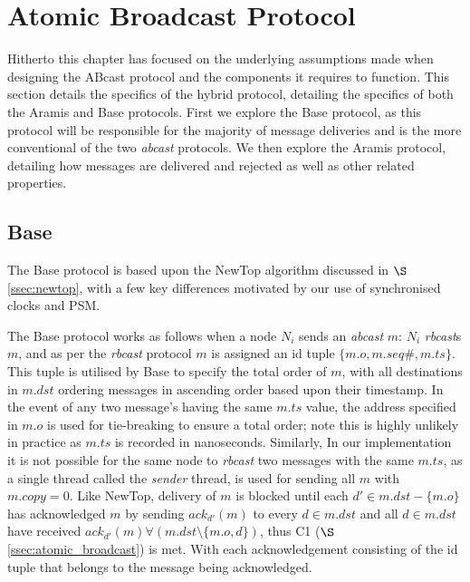 \clearpage
\section{Atomic Broadcast Protocol}\label{sec:ABcast}
Hitherto this chapter has focused on the underlying assumptions made when designing the \textsf{ABcast} protocol and the components it requires to function.  This section details the specifics of the hybrid protocol, detailing the specifics of both the \textsf{Aramis} and \textsf{Base} protocols.  First we explore the \textsf{Base} protocol, as this protocol will be responsible for the majority of message deliveries and is the more conventional of the two \emph{abcast} protocols.  We then explore the \textsf{Aramis} protocol, detailing how messages are delivered and rejected as well as other related properties.  

    \subsection{Base}
    The \textsf{Base} protocol is based upon the NewTop \citep{Ezhilchelvan:1995:NFG:876885.880005} algorithm discussed in $\S$ \ref{ssec:newtop}, with a few key differences motivated by our use of synchronised clocks and PSM.  
    
    The \textsf{Base} protocol works as follows when a node $N_i$ sends an \emph{abcast} $m$: $N_i$ \emph{rbcast}s $m$, and as per the \emph{rbcast} protocol $m$ is assigned an id tuple $\{m.o, m.seq\#, m.ts\}$.  This tuple is utilised by \textsf{Base} to specify the total order of $m$, with all destinations in $m.dst$ ordering messages in ascending order based upon their timestamp.  In the event of any two message's having the same $m.ts$ value, the address specified in $m.o$ is used for tie-breaking to ensure a total order; note this is highly unlikely in practice as $m.ts$ is recorded in nanoseconds.  Similarly, In our implementation it is not possible for the same node to \emph{rbcast} two messages with the same $m.ts$, as a single thread called the \emph{sender} thread, is used for sending all $m$ with $m.copy = 0$.  Like NewTop, delivery of $m$ is blocked until each $d' \in m.dst - \{m.o\}$ has acknowledged $m$ by sending $ack_{d'}(m)$ to every $d \in m.dst$ and all $d \in m.dst$ have received $ack_{d'}(m) \forall (m.dst \setminus \{m.o,d\})$, thus C1 ($\S$ \ref{ssec:atomic_broadcast}) is met.  With each acknowledgement consisting of the id tuple that belongs to the message being acknowledged.  
    

